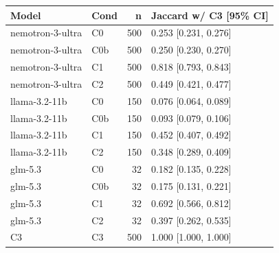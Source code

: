 \begin{tabular}{llrl}
\toprule
Model & Cond & n & Jaccard w/ C3 [95\% CI] \\
\midrule
nemotron-3-ultra & C0 & 500 & 0.253 [0.231, 0.276] \\
nemotron-3-ultra & C0b & 500 & 0.250 [0.230, 0.270] \\
nemotron-3-ultra & C1 & 500 & 0.818 [0.793, 0.843] \\
nemotron-3-ultra & C2 & 500 & 0.449 [0.421, 0.477] \\
llama-3.2-11b & C0 & 150 & 0.076 [0.064, 0.089] \\
llama-3.2-11b & C0b & 150 & 0.093 [0.079, 0.106] \\
llama-3.2-11b & C1 & 150 & 0.452 [0.407, 0.492] \\
llama-3.2-11b & C2 & 150 & 0.348 [0.289, 0.409] \\
glm-5.3 & C0 & 32 & 0.182 [0.135, 0.228] \\
glm-5.3 & C0b & 32 & 0.175 [0.131, 0.221] \\
glm-5.3 & C1 & 32 & 0.692 [0.566, 0.812] \\
glm-5.3 & C2 & 32 & 0.397 [0.262, 0.535] \\
C3 & C3 & 500 & 1.000 [1.000, 1.000] \\
\bottomrule
\end{tabular}
